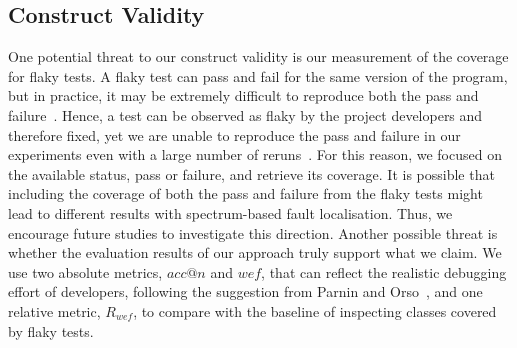 \subsection{Construct Validity} 
One potential threat to our construct validity is our measurement of the coverage for flaky tests.
A flaky test can pass and fail for the same version of the program, but in practice, it may be extremely difficult to reproduce both the pass and failure~\cite{FlakeFlagger,Lam2020}.
Hence, a test can be observed as flaky by the project developers and therefore fixed, yet we are unable to reproduce the pass and failure in our experiments even with a large number of reruns~\cite{FlakeFlagger}.
For this reason, we focused on the available status, \ie pass or failure, and retrieve its coverage.
It is possible that including the coverage of both the pass and failure from the flaky tests might lead to different results with spectrum-based fault localisation.
Thus, we encourage future studies to investigate this direction.
Another possible threat is whether the evaluation results of our approach truly support what we claim. 
We use two absolute metrics, $acc@n$ and $wef$, that can reflect the realistic debugging effort of developers, following the suggestion from Parnin and Orso~\cite{parnin}, and one relative metric, $R_{wef}$, to compare with the baseline of inspecting classes covered by flaky tests. 